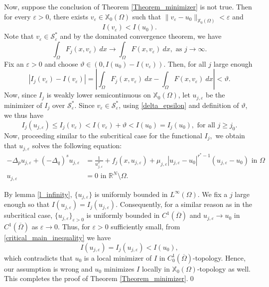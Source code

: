 \documentclass[reqno,oneside]{amsart}
\theoremstyle{definition}
\theoremstyle{remark}
\numberwithin{equation}{section}
\newcommand{\Om} {\Omega}
\newcommand{\p}{\Delta_p}
\newcommand{\qs}{(-\Delta_q)^s}
\newcommand{\bdry}{\mathbb{R}^N \setminus \Omega}
\newcommand{\rar}{\rightarrow}
\newcommand{\omc}{(\overline{\Om})}
\newcommand{\xo}{\mathbb{X}_0}
\begin{document}
Now, suppose the conclusion of Theorem \ref{Theorem_minimizer} is not true. Then for every $\varepsilon>0$, there exists $v_{\varepsilon} \in \xo(\Om)$ such that $\|v_{\varepsilon} - u_0\|_{\xo(\Om)} < \varepsilon$ and
\begin{equation}
    I(v_{\varepsilon})<I(u_0).
\end{equation}
Note that $v_{\varepsilon} \in \mathcal{S}^*_{\varepsilon}$ and by the dominated convergence theorem, we have
\[\int_{\Om} F_j (x,v_{\varepsilon})\ dx \rar \int_{\Om} F (x,v_{\varepsilon})\ dx, \text{ as } j\rar\infty.\]
Fix an $\varepsilon>0$ and choose $\vartheta \in (0, I(u_0) - I(v_{\varepsilon}))$. Then, for all $j$ large enough
\begin{equation}\label{delta_epsilon}
    \left| I_j (v_{\varepsilon}) - I(v_{\varepsilon}) \right| = \left|\int_{\Om} F_j (x,v_{\varepsilon})\ dx - \int_{\Om} F(x, v_{\varepsilon})\ dx \right|< \vartheta.
\end{equation}
Now, since $I_j$ is weakly lower semicontinuous on $\xo(\Om)$, let $u_{j,\varepsilon}$ be the minimizer of $I_j$ over $\mathcal{S}^*_{\varepsilon}$. Since $v_{\varepsilon} \in \mathcal{S}^*_{\varepsilon}$, using \eqref{delta_epsilon} and definition of $\vartheta$, we thus have
\begin{equation}\label{critical_main_inequality}
    I_j (u_{j,\varepsilon}) \leq I_j (v_{\varepsilon}) < I(v_{\varepsilon}) + \vartheta < I(u_0) = I_j (u_0), \text{ for all } j\geq j_0.
\end{equation}
Now, proceeding similar to the subcritical case for the functional $I_j,$ we obtain that $u_{j,\varepsilon}$ solves the following equation:
\begin{equation}
    \begin{aligned}
        -\p u_{j,\varepsilon} + \qs u_{j,\varepsilon} &= \frac{1}{u_{j,\varepsilon}^{\delta}} + f_j \left(x,u_{j,\varepsilon} \right) + \mu_{j,\varepsilon} |u_{j,\varepsilon} - u_0|^{r^* - 1} (u_{j,\varepsilon} - u_0) \text{ in } \Om\\
        u_{j,\varepsilon} &= 0 \text{ in } \bdry.
    \end{aligned}
\end{equation}

By lemma \ref{l_infinity}, $\{u_{j,\varepsilon}\}$ is uniformly bounded in $L^{\infty}(\Om)$. We fix a $j$ large enough so that $I \left(u_{j,\varepsilon} \right) = I_j \left(u_{j,\varepsilon} \right).$ Consequently, for a similar reason as in the subcritical case, $\{u_{j,\varepsilon}\}_{\varepsilon>0}$ is uniformly bounded in $C^1 \omc$ and $u_{j,\varepsilon} \rar u_0$ in $C^1 \omc$ as $\varepsilon \rar 0$. Thus, for $\varepsilon>0$ sufficiently small, from \eqref{critical_main_inequality} we have
\[I \left(u_{j,\varepsilon} \right) = I_j \left(u_{j,\varepsilon} \right) < I(u_0),\]
which contradicts that $u_0$ is a local minimizer of $I$ in $C^1_0 \omc$-topology. Hence, our assumption is wrong and $u_0$ minimizes $I$ locally in $\xo(\Om)$-topology as well. This completes the proof of Theorem \ref{Theorem_minimizer}.\hfill\qed
\end{document}
